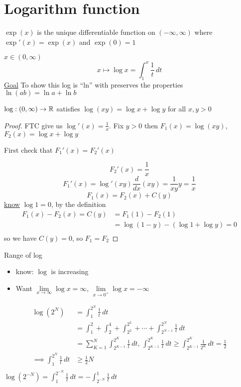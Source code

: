 \section{Logarithm function}

\begin{definition*}
  $\exp(x)$ is the unique differentiable function on $(-\infty, \infty)$  
  where $\exp'(x) = \exp(x)$ and $\exp(0) = 1$
\end{definition*}

\begin{example*}
  $x \in (0, \infty)$
  \[x \mapsto \log x = \int_1^x \frac{1}{t}\,dt\]
  \underline{Goal} To show this log is ``ln'' with preserves the properties $\ln(ab) = \ln a + \ln b$
\end{example*}

\begin{theorem*}
  $\log : (0, \infty) \to \mathbb R$ satisfies $\log(xy) = \log x + \log y$ for all $x, y > 0$
\end{theorem*}

\begin{proof}
  FTC give us $\log'(x) = \frac{1}{x}$.
  Fix $y > 0$ then $F_1(x) = \log(xy)$, $F_2(x) = \log x + \log y$

  First check that $F_1'(x) = F_2'(x)$

  \[F_2'(x) = \frac{1}{x}\]
  \[F_1'(x) = \log'(xy) \frac{d}{dx}(xy) = \frac{1}{xy}y=\frac{1}{x}\]
  \[F_1(x) = F_2(x) + C(y)\]
  \underline{know} $\log 1 = 0$, by the definition
  \begin{align*}
    F_1(x) - F_2(x) = C(y) &= F_1(1) - F_2(1) \\
    &= \log(1-y) - (\log 1 + \log y)  = 0\\
  \end{align*}
  so we have $C(y) = 0$, so $F_1 = F_2$
\end{proof}

Range of log
\begin{itemize}
  \item know: $\log$ is increasing
  \item Want $\lim\limits_{x\to \infty} \log x = \infty$, $\lim\limits_{x\to 0^+} \log x = -\infty$
\end{itemize}
\begin{align*}
  \log(2^N) &= \int_1^{2^N} \frac{1}{t}\,dt \\
  &= \int_1^2 + \int_2^4 + \int_{2^2}^{2^3} + \cdots + \int_{2^{N-1}}^{2^N} \frac{1}{t}\,dt\\
  &= \sum_{K=1}^N \int_{2^{K-1}}^{2^K} \frac{1}{t}\,dt,\, \int_{2^{K-1}}^{2^K} \frac{1}{t}\,dt \ge \int_{2^{K-1}}^{2^K} \frac{1}{2^K}\,dt =\frac{1}{2}\\
  \implies \int_1^{2^N} \frac{1}{t}\,dt &\ge \frac{1}{2}N\\
\end{align*}
$\displaystyle\log(2^{-N}) = \int_1^{2^{-N}} \frac{1}{t}\,dt =-\int_{2^{-N}}^1 \frac{1}{t}\,dt$

